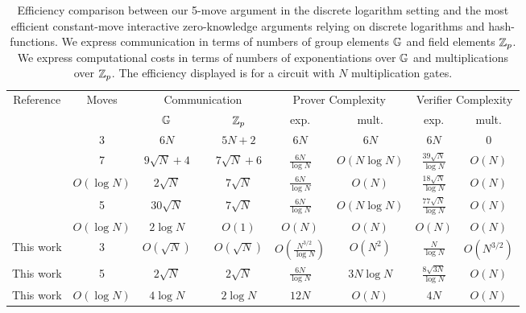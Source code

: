 \begin{table}
\centering
\begin{tabular}{|c|c|ccc|cc|cc|}
\hline
Reference & Moves &\multicolumn{3}{c|}{ Communication}&\multicolumn{2}{c|}{Prover Complexity}&\multicolumn{2}{c|}{Verifier Complexity}\\
&& $\mathbb{G}$ &\;\;& $\mathbb{Z}_p$ & exp. & mult. & exp. & mult. \\
\hline
\cite{Cramer1998a}& 3& $6N$  && $5N +2$ & $6N $ & $6N$& $6N$ & $0$ \\%
\cite{Groth2009b}& 7 &$9 \sqrt{N}+4$&&$7\sqrt{N}+6$&$\frac{6N}{\log{N}}$ &$O\left(N \log N\right)$&$\frac{39\sqrt{N}}{\log{N}}$&$O\left(N\right)$ \\
\cite{Groth2009b}& $O(\log{N})$ &$2\sqrt{N}$&&$7\sqrt{N}$&$\frac{6N}{\log{N}}$ & $O(N)$ &  $\frac{18\sqrt{N}}{\log{N}}$&$O\left(N\right)$\\
\cite{Seo2011a}&5&$30\sqrt{N}$ &&$7\sqrt{N}$&$\frac{6N}{\log{N}}$  &$O\left(N\log N\right)$& $\frac{77\sqrt{N}}{\log{N}}$&$O\left(N\right)$\\
\cite{BunzBBPWM18} & $O(\log{N})$  %
& $2\log{N}$ &&$O(1)$& $ O(N)$  & $O(N)$ & $O(N)$&$O(N)$ \\
\hline
This work & 3& $O(\sqrt{N})$&&$O(\sqrt{N})$&$O(\frac{N^{3/2}}{\log{N}})$& $O(N^2)$ &$\frac{N}{\log N}$ & $O(N^{3/2})$ \\
\hline
This work & 5& $2\sqrt{N}$&&$2\sqrt{N}$&$\frac{6N}{\log{N}}$& $3N \log{N}$ &$\frac{8\sqrt{3N}}{\log{N}}$ & $O(N)$ \\
\hline
This work & $O(\log{N})$  %
& $4\log{N}$ &&$2\log{N}$& $ 12N$  & $O(N)$ & $4N$&$O(N)$ \\
\hline
\end{tabular}
\vspace{.2cm}
\caption{Efficiency comparison between our 5-move argument in the discrete logarithm setting and the most efficient constant-move interactive zero-knowledge arguments relying on discrete logarithms and hash-functions. We express communication in terms of numbers of group elements $\mathbb{G}$ and field elements $\mathbb{Z}_p$. We express computational costs in terms of numbers of exponentiations over $\mathbb{G}$ and multiplications over $\mathbb{Z}_p$. The efficiency displayed is for a circuit with $N$ multiplication gates.\label{table:previous}} 
\end{table}

